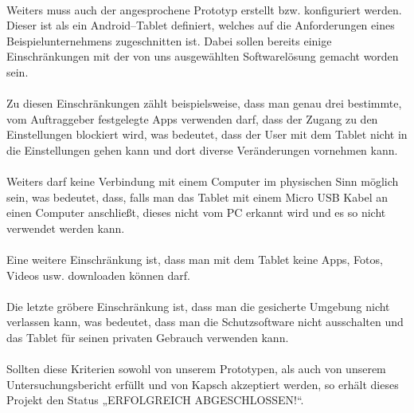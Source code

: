 \paragraph*{}
Weiters muss auch der angesprochene Prototyp erstellt bzw. konfiguriert werden. Dieser ist als ein Android–Tablet definiert, welches auf  die Anforderungen eines Beispielunternehmens zugeschnitten ist. Dabei sollen bereits einige Einschränkungen mit der von uns ausgewählten Softwarelösung gemacht worden sein.
\paragraph*{}
Zu diesen Einschränkungen zählt beispielsweise, dass man genau drei bestimmte, vom Auftraggeber festgelegte Apps verwenden darf, dass der Zugang zu den Einstellungen blockiert wird, was bedeutet, dass der User mit dem Tablet nicht in die Einstellungen gehen kann und dort diverse Veränderungen vornehmen kann.
\paragraph*{}
Weiters darf keine Verbindung mit einem Computer im physischen Sinn möglich sein, was bedeutet, dass, falls man das Tablet mit einem Micro USB Kabel an einen Computer anschließt, dieses nicht vom PC erkannt wird und es so nicht verwendet werden kann.
\paragraph*{}
Eine weitere Einschränkung ist, dass man mit dem Tablet keine Apps, Fotos, Videos usw. downloaden können darf.
\paragraph*{}
Die letzte gröbere Einschränkung ist, dass man die gesicherte Umgebung nicht verlassen kann, was bedeutet, dass man die Schutzsoftware nicht ausschalten und das Tablet für seinen privaten Gebrauch verwenden kann.
\paragraph*{}
Sollten diese Kriterien sowohl von unserem Prototypen, als auch von unserem Untersuchungsbericht erfüllt und von Kapsch akzeptiert werden, so erhält dieses Projekt den Status „ERFOLGREICH ABGESCHLOSSEN!“. 